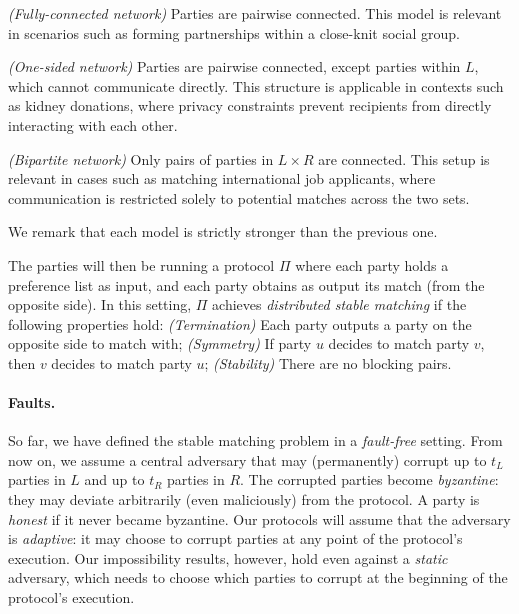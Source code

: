 \noindent \emph{(Fully-connected network)} Parties are pairwise connected. This model is relevant in scenarios such as forming partnerships within a close-knit social group.

\noindent \emph{(One-sided network)} Parties are pairwise connected, except parties within $L$, which cannot communicate directly. This structure is applicable in contexts such as kidney donations, where privacy constraints prevent recipients from directly interacting with each other.

\noindent \emph{(Bipartite network)}
Only pairs of parties in $L \times R$ are connected.
This setup is relevant in cases such as matching international job applicants, where communication is restricted solely to potential matches across the two sets.

\vspace{0.1cm}


We remark that each model is strictly stronger than the previous one. 


The parties will then be running a protocol $\Pi$ where each party holds a preference list as input, and each party obtains as output its match (from the opposite side). In this setting, $\Pi$ achieves \emph{distributed stable matching} if the following properties hold:
\emph{(Termination)} Each party outputs a party on the opposite side to match with;
\emph{(Symmetry)} If party $u$ decides to match party $v$, then $v$ decides to match party $u$;
\emph{(Stability)} There are no blocking pairs.


\paragraph{Faults.}
So far, we have defined the stable matching problem in a \emph{fault-free} setting. From now on, we assume a central adversary that may (permanently) corrupt up to $t_L$ parties in $L$ and up to $t_R$ parties in $R$. The corrupted parties become \emph{byzantine}: they may deviate arbitrarily (even maliciously) from the protocol. A party is \emph{honest} if it never became byzantine.
Our protocols will assume that the adversary is \emph{adaptive}: it may choose
to corrupt parties at any point of the protocol's execution. Our impossibility results, however, hold even against a \emph{static} adversary, which needs to choose which parties to corrupt at the beginning of the protocol's execution.


